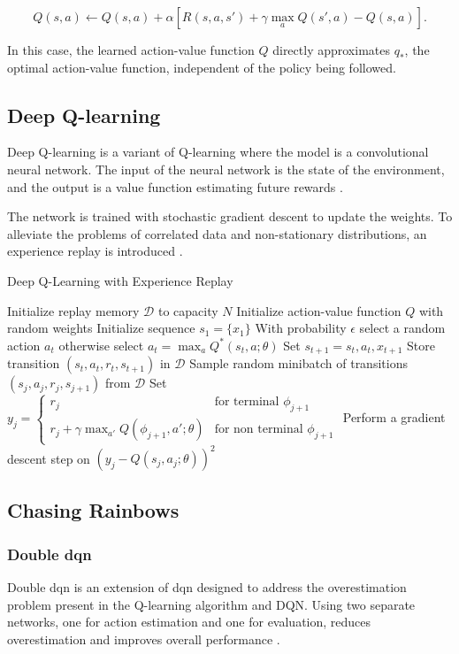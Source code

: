 $$
Q(s, a) \leftarrow Q(s, a) + \alpha \left[R(s, a, s') + \gamma \max_a Q(s', a) - Q(s, a)\right].
$$

In this case, the learned action-value function $Q$ directly approximates $q_*$, the optimal action-value function, independent of the policy being followed.

\subsection{Deep Q-learning} \label{subsec:deep_q_learning}
Deep Q-learning is a variant of Q-learning where the model is a convolutional neural network. The input of the neural network is the state of the environment, and the output is a value function estimating future rewards \cite{dqn2}.

The network is trained  with stochastic gradient descent to update the weights. To alleviate the problems of correlated data and non-stationary distributions, an experience replay is introduced \cite{dqn1}.

\begin{algorithm}
\caption{Deep Q-Learning with Experience Replay \cite{dqn1,dqn2}}
\label{algo:dqn}
\begin{algorithmic}
\State Initialize replay memory $\mathcal{D}$ to capacity $N$
\State Initialize action-value function $Q$ with random weights
\State Initialize sequence $s_1 = \{ x_1 \}$
\State With probability $\epsilon$ select a random action $a_t$
\State otherwise select $a_t = \max_a Q^*(s_t, a; \theta)$
\State Set $s_{t+1} = s_t, a_t, x_{t+1}$
\State Store transition $(s_t, a_t, r_t, s_{t+1})$ in $\mathcal{D}$
\State Sample random minibatch of transitions $(s_j, a_j, r_j, s_{j+1})$ from $\mathcal{D}$
\State Set $ y_j =
\begin{cases}
r_j &\text{for terminal } \phi_{j+1} \\
r_j + \gamma \max_{a'} Q(\phi_{j+1}, a'; \theta) &\text{for non terminal } \phi_{j+1}
\end{cases}
$
\State Perform a gradient descent step on $(y_j - Q(s_j, a_j; \theta))^2$
\EndFor
\EndFor
\end{algorithmic}
\end{algorithm}

\subsection{Chasing Rainbows} \label{subsec:rainbow}
\subsubsection{Double \acrshort{dqn}} \label{subsubsec:double_dqn}
Double \acrshort{dqn} is an extension of \acrshort{dqn} designed to address the overestimation problem present in the Q-learning algorithm and DQN. Using two separate networks, one for action estimation and one for evaluation, reduces overestimation and improves overall performance \cite{double_dqn}.


